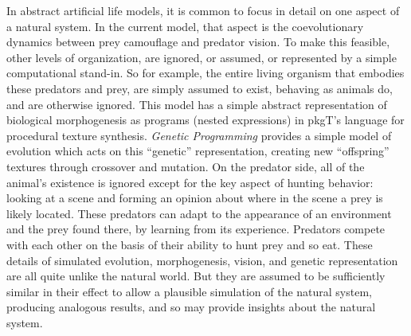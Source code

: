 \documentclass[acmtog,
    anonymous,
    review
    ]{acmart}
\newcommand{\jargon}[1]{\textit{#1}}
\newcommand{\texsyn}[0]{pkgT}
\begin{document}
In abstract artificial life models, it is common to focus in detail on one aspect of a natural system. In the current model, that aspect is the coevolutionary dynamics between prey camouflage and predator vision. To make this feasible, other levels of organization, are ignored, or assumed, or represented by a simple computational stand-in. So for example, the entire living organism that embodies these predators and prey, are simply assumed to exist, behaving as animals do, and are otherwise ignored. This model has a simple abstract representation of biological morphogenesis as programs (nested expressions) in \texsyn{}'s language for procedural texture synthesis. \jargon{Genetic Programming} provides a simple model of evolution which acts on this “genetic” representation, creating new “offspring” textures through crossover and mutation. On the predator side, all of the animal's existence is ignored except for the key aspect of hunting behavior: looking at a scene and forming an opinion about where in the scene a prey is likely located. These predators can adapt to the appearance of an environment and the prey found there, by learning from its experience. Predators compete with each other on the basis of their ability to hunt prey and so eat. These details of simulated evolution, morphogenesis, vision, and genetic representation are all quite unlike the natural world. But they are assumed to be sufficiently similar in their effect to allow a plausible simulation of the natural system, producing analogous results, and so may provide insights about the natural system.
\par

\end{document}
